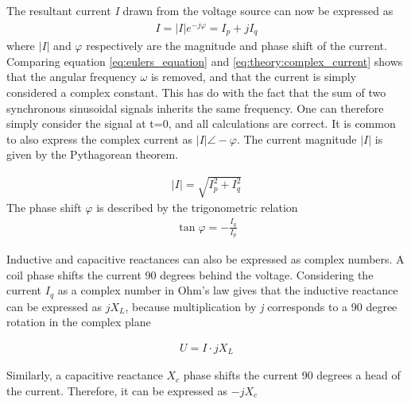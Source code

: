 \documentclass[class=book, crop=false]{standalone}
\begin{document}
The resultant current \textit{I} drawn from the voltage source can now be expressed as 
\begin{equation}
   \begin{aligned}\label{eq:theory:complex_current}
I = |I|e^{-j \varphi} = I_{p} + jI_{q}
\end{aligned} 
\end{equation}
where $|I|$ and $\varphi$ respectively are the magnitude and phase shift of the current. Comparing equation \eqref{eq:eulers_equation} and \eqref{eq:theory:complex_current} shows that the angular frequency $\omega$ is removed, and that the current is simply considered a complex constant. This has do with the fact that the sum of two synchronous sinusoidal signals inherits the same frequency. One can therefore simply consider the signal at t=0, and all calculations are correct. It is common to also express the complex current as $|I|\angle -\varphi$. The current magnitude $|I|$ is given by the Pythagorean theorem. 

\begin{equation}
   \begin{aligned}\label{eq:theory:pythagoras_current}
|I| = \sqrt{I_{p}^{2} + I_{q}^{2}}
\end{aligned} 
\end{equation}
The phase shift $\varphi$ is described by the trigonometric relation
\begin{equation}
   \begin{aligned}\label{eq:theory:phase_shift_current
   }
   \tan{\varphi} = -\frac{I_{q}}{I_{p}}
\end{aligned} 
\end{equation}



Inductive and capacitive reactances can also be expressed as complex numbers. A coil phase shifts the current 90 degrees behind the voltage. Considering the current $I_{q}$ as a complex number in Ohm's law gives that the inductive reactance can be expressed as $jX_{L}$, because multiplication by \textit{j} corresponds to a 90 degree rotation in the complex plane

\begin{equation}
   \begin{aligned}\label{eq:theory:complex_rectance_capacitive}
U = I\cdot jX_{L}
\end{aligned} 
\end{equation}

Similarly, a capacitive reactance $X_{c}$ phase shifts the current 90 degrees a head of the current. Therefore, it can be expressed as $-jX_{c}$
\end{document}
